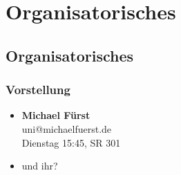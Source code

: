 

\section{Organisatorisches}

\subsection{Organisatorisches}

\begin{frame}
	\frametitle{Vorstellung}
	
	\begin{itemize}
		\item \textbf{Michael Fürst} \\ uni@michaelfuerst.de \\ Dienstag 15:45, SR 301
		\\
		\item und ihr?
	\end{itemize}
\end{frame}

